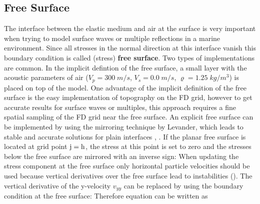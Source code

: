 \documentclass[11pt,onecolumn,oneside]{article}
\begin{document}
\subsection{Free Surface}
The interface between the elastic medium and air at the surface is very important when trying to model surface waves or multiple reflections
in a marine environment. Since all stresses in the normal direction at this interface vanish
this boundary condition is called (stress) {\bf{free surface}}.
Two types of implementations are common. In the implicit defintion of the free surface, a small layer with the acoustic parameters of air
($V_p=300\;m/s$, $V_s=0.0\;m/s$, $\varrho=1.25\;kg/m^3$) is placed on top of the model. One advantage of the implicit definition
of the free surface is the easy implementation of topography on the FD grid, however to get accurate results for surface waves or multiples,
this approach requires a fine spatial sampling of the FD grid near the free surface. An explicit free surface can be implemented by using
the mirroring technique by Levander, which leads to stable and accurate solutions for plain interfaces \cite{levander:88}, \cite{robertsson:95}. If the planar free surface is located at grid point $\rm{j=h}$, the stress at this point is set to zero and the stresses below the free surface are mirrored with an inverse sign:
When updating the stress component 
 at the free surface only horizontal particle velocities should be used because vertical derivatives over the free surface lead to instabilities (\cite{levander:88}). The vertical derivative of the y-velocity $v_{yy}$ can be replaced by using the boundary condition at the free surface:
Therefore equation   can be written as
\end{document}
